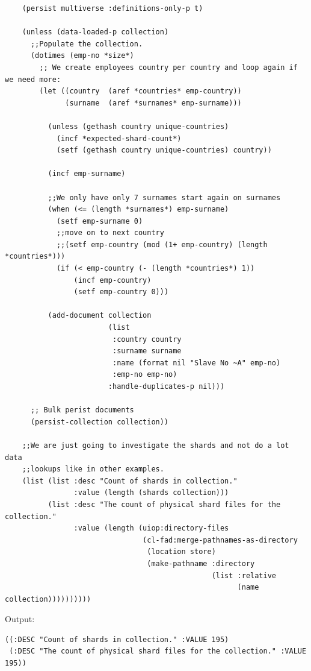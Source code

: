 \documentclass[11pt]{article}
\begin{document}
\begin{verbatim}
    (persist multiverse :definitions-only-p t)

    (unless (data-loaded-p collection)
      ;;Populate the collection.
      (dotimes (emp-no *size*)
        ;; We create employees country per country and loop again if we need more:
        (let ((country  (aref *countries* emp-country))
              (surname  (aref *surnames* emp-surname)))

          (unless (gethash country unique-countries)
            (incf *expected-shard-count*)
            (setf (gethash country unique-countries) country))

          (incf emp-surname)

          ;;We only have only 7 surnames start again on surnames
          (when (<= (length *surnames*) emp-surname)
            (setf emp-surname 0)
            ;;move on to next country
            ;;(setf emp-country (mod (1+ emp-country) (length *countries*)))
            (if (< emp-country (- (length *countries*) 1))
                (incf emp-country)
                (setf emp-country 0)))

          (add-document collection
                        (list
                         :country country
                         :surname surname
                         :name (format nil "Slave No ~A" emp-no)
                         :emp-no emp-no)
                        :handle-duplicates-p nil)))

      ;; Bulk perist documents
      (persist-collection collection))

    ;;We are just going to investigate the shards and not do a lot data
    ;;lookups like in other examples.
    (list (list :desc "Count of shards in collection."
                :value (length (shards collection)))
          (list :desc "The count of physical shard files for the collection."
                :value (length (uiop:directory-files
                                (cl-fad:merge-pathnames-as-directory
                                 (location store)
                                 (make-pathname :directory
                                                (list :relative
                                                      (name collection))))))))))

\end{verbatim}

Output:

\begin{verbatim}
((:DESC "Count of shards in collection." :VALUE 195)
 (:DESC "The count of physical shard files for the collection." :VALUE 195))
\end{verbatim}
\end{document}

